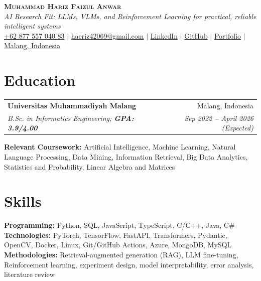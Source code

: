 \documentclass[letterpaper,9pt]{article}
\makeatletter
\newcommand{\resumeSubheading}[4]{
  \vspace{0pt}\item
    \begin{tabular*}{0.99\textwidth}[t]{l@{\extracolsep{\fill}}r}
      \textbf{#1} & #2 \\
      \textit{\small#3} & \textit{\small #4} \\
    \end{tabular*}\vspace{0pt}
}
\newcommand{\resumeSubHeadingListStart}{\begin{itemize}[leftmargin=0.06in, label={}, itemsep=0pt, topsep=0pt, parsep=0pt, partopsep=0pt]}
\newcommand{\resumeSubHeadingListEnd}{\end{itemize}}
\makeatother
\begin{document}
\begin{center}
    \textbf{\Large \scshape Muhammad Hariz Faizul Anwar} \\ \vspace{0pt}
    \footnotesize\textit{AI Research Fit: LLMs, VLMs, and Reinforcement Learning for practical, reliable intelligent systems} \\ \vspace{1pt}
    \small
    \faMobile \hspace{.5pt} \href{tel:6287755704083}{+62 877 557 040 83}
    $|$
    \faAt \hspace{.5pt} \href{mailto:haeriz42069@gmail.com}{haeriz42069@gmail.com}
    $|$
    \faLinkedinSquare \hspace{.5pt} \href{https://www.linkedin.com/in/muhammad-hariz-faizul-anwar-471241302}{LinkedIn}
    $|$
    \faGithub \hspace{.5pt} \href{https://github.com/Haeryz}{GitHub}
    $|$
    \faGlobe \hspace{.5pt} \href{haer}{Portfolio}
    $|$
    \faMapMarker \hspace{.5pt} \href{https://maps.app.goo.gl/5XbC2hS3L9QsE9kC7}{Malang, Indonesia}
\end{center}

\section{Education}
  \vspace{-2pt}
  \resumeSubHeadingListStart

    \resumeSubheading
      {Universitas Muhammadiyah Malang
      }{Malang, Indonesia}
      {B.Sc. in Informatics Engineering;   \textbf{GPA: 3.9/4.00}}{Sep 2022 \textbf{--} April 2026 (Expected)}

    \footnotesize{\item{
        \textbf{Relevant Coursework:}{ Artificial Intelligence, Machine Learning, Natural Language Processing, Data Mining, Information Retrieval, Big Data Analytics, Statistics and Probability, Linear Algebra and Matrices}
    }}

  \resumeSubHeadingListEnd

\section{Skills}
  \vspace{-2pt}
  \resumeSubHeadingListStart
    \footnotesize{\item{
        \textbf{Programming:}{ Python, SQL, JavaScript, TypeScript, C/C++, Java, C\#} \\
        \textbf{Technologies:}{ PyTorch, TensorFlow, FastAPI, Transformers, Pydantic, OpenCV, Docker, Linux, Git/GitHub Actions, Azure, MongoDB, MySQL} \\
        \textbf{Methodologies:}{ Retrieval-augmented generation (RAG), LLM fine-tuning, Reinforcement learning, experiment design, model interpretability, error analysis, literature review}
    }}
  \resumeSubHeadingListEnd
\end{document}
